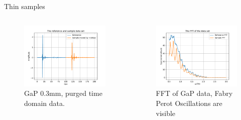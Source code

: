 \documentclass[aspectratio=1610, 9pt]{beamer}
\begin{document}
\begin{frame}{Thin samples}
  \begin{center}
    \begin{columns}
      \begin{column}{0.5\textwidth}
        \begin{figure}
        \includegraphics[width=\textwidth]{images/GAP/THz_timedomain.pdf}
        \caption{GaP 0.3mm, purged time domain data.}
        \end{figure}
      \end{column}
      \begin{column}{0.5\textwidth}
        \begin{figure}
        \includegraphics[width=\textwidth]{images/GAP/THz_FFT.pdf}
        \caption{FFT of GaP data, Fabry Perot Oscillations are visible}
        \end{figure}
      \end{column}
    \end{columns}
  \end{center}
\end{frame}
\end{document}
